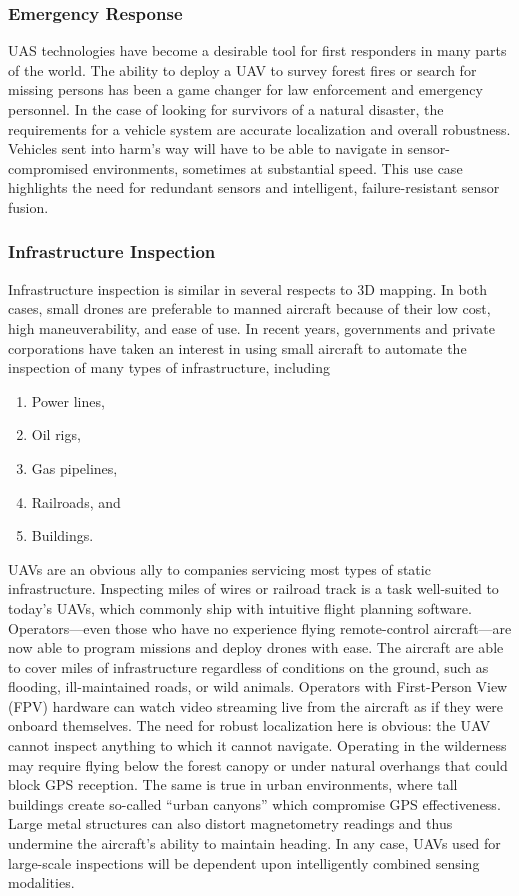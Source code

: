\subsubsection{Emergency Response}

UAS technologies have become a desirable tool for first responders in many parts of the world. The ability to deploy a UAV to survey forest fires or search for missing persons has been a game changer for law enforcement and emergency personnel. In the case of looking for survivors of a natural disaster, the requirements for a vehicle system are accurate localization and overall robustness. Vehicles sent into harm's way will have to be able to navigate in sensor-compromised environments, sometimes at substantial speed. This use case highlights the need for redundant sensors and intelligent, failure-resistant sensor fusion.

\subsubsection{Infrastructure Inspection}

Infrastructure inspection is similar in several respects to 3D mapping. In both cases, small drones are preferable to manned aircraft because of their low cost, high maneuverability, and ease of use. In recent years, governments and private corporations have taken an interest in using small aircraft to automate the inspection of many types of infrastructure, including
\begin{enumerate}
    \item Power lines,
    \item Oil rigs,
    \item Gas pipelines,
    \item Railroads, and
    \item Buildings.
\end{enumerate}
UAVs are an obvious ally to companies servicing most types of static infrastructure. Inspecting miles of wires or railroad track is a task well-suited to today's UAVs, which commonly ship with intuitive flight planning software. Operators---even those who have no experience flying remote-control aircraft---are now able to program missions and deploy drones with ease. The aircraft are able to cover miles of infrastructure regardless of conditions on the ground, such as flooding, ill-maintained roads, or wild animals. Operators with First-Person View (FPV) hardware can watch video streaming live from the aircraft as if they were onboard themselves. The need for robust localization here is obvious: the UAV cannot inspect anything to which it cannot navigate. Operating in the wilderness may require flying below the forest canopy or under natural overhangs that could block GPS reception. The same is true in urban environments, where tall buildings create so-called ``urban canyons'' which compromise GPS effectiveness. Large metal structures can also distort magnetometry readings and thus undermine the aircraft's ability to maintain heading. In any case, UAVs used for large-scale inspections will be dependent upon intelligently combined sensing modalities.

